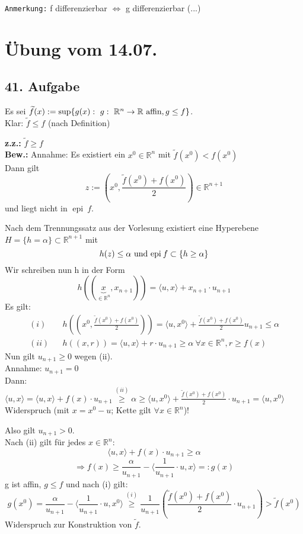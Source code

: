 \documentclass[a4paper,11pt,twoside,titlepage]{article}
\newcommand{\R}{{\mathbb R}}
\newcommand{\epi}{{\operatorname{epi}\:}}
\begin{document}
\texttt{Anmerkung:} f differenzierbar $\Leftrightarrow$ g differenzierbar (...)

\newpage
\section{Übung vom 14.07.}

\subsection*{41. Aufgabe}
Es sei $\widetilde{f}(x):=\sup\{g(x):\ g:\ \R^n\to\R\textnormal{ affin},g\le f\}$.\\
Klar: $\widetilde{f}\leq f$ (nach Definition)

\textbf{z.z.:} $\widetilde{f}\geq f$\\
\textbf{Bew.:} Annahme: Es existiert ein $x^0\in\R^n$ mit $\widetilde{f}(x^0)<f(x^0)$\\
Dann gilt
\[z:=(x^0,\frac{\widetilde{f}(x^0)+f(x^0)}{2})\in\R^{n+1}\]
und liegt nicht in $\epi f$.

Nach dem Trennungssatz aus der Vorlesung existiert eine Hyperebene\\ $H=\{h=\alpha\}\subset\R^{n+1}$ mit 
\[h(z)\leq\alpha\textnormal{ und }\epi f\subset\{h\geq\alpha\}\]
Wir schreiben nun h in der Form
\[h((\underbrace{x}_{\in\R^n},x_{n+1}))=\langle u,x\rangle+x_{n+1}\cdot u_{n+1}\]
Es gilt:
\begin{eqnarray*}
(i)&&h((x^0,\frac{\widetilde{f}(x^0)+f(x^0)}{2}))=\langle u,x^0\rangle +\frac{\widetilde{f}(x^0)+f(x^0)}{2}u_{n+1}\leq\alpha\\
(ii)&&h((x,r))=\langle u,x\rangle+r\cdot u_{n+1}\geq\alpha\ \forall x\in\R^n, r\geq f(x)
\end{eqnarray*}
Nun gilt $u_{n+1}\geq 0$ wegen (ii).\\
Annahme: $u_{n+1}=0$\\
Dann: $\langle u,x\rangle=\langle u,x\rangle +f(x)\cdot u_{n+1}\stackrel{(ii)}{\geq}\alpha\geq\langle u,x^0\rangle+\frac{\widetilde{f}(x^0)+f(x^0)}{2}\cdot u_{n+1}=\langle u,x^0\rangle$ Widerspruch (mit $x=x^0-u$; Kette gilt $\forall x\in\R^n$)!

Also gilt $u_{n+1}>0$.\\
Nach (ii) gilt für jedes $x\in\R^n$:
\[\langle u,x \rangle+f(x)\cdot u_{n+1}\geq\alpha\]
\[\Rightarrow f(x)\geq \frac{\alpha}{u_{n+1}}-\langle \frac{1}{u_{n+1}}\cdot u,x\rangle=:g(x)\]
g ist affin, $g\le f$ und nach (i) gilt:
\[g(x^0)=\frac{\alpha}{u_{n+1}}-\langle \frac{1}{u_{n+1}}\cdot u,x^0\rangle\stackrel{(i)}{\geq}\frac{1}{u_{n+1}}\left(\frac{\widetilde{f}(x^0)+f(x^0)}{2}\cdot u_{n+1}\right)>\widetilde{f}(x^0)\]
Widerspruch zur Konstruktion von $\widetilde{f}$.
\end{document}
